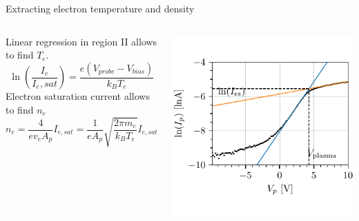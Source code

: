 \documentclass[10pt]{beamer}
\begin{document}
\begin{frame}{Extracting electron temperature and density}
    \begin{columns}
        Linear regression in region II allows to find $T_e$.
        \begin{equation*}
            \ln\left(\frac{I_e}{I_e,sat} \right) = \frac{e(V_{probe} - V_{bias})}{k_B T_e}
        \end{equation*} 
        Electron saturation current allows to find $n_e$
        \begin{equation*}
            n_e = \frac{4}{e v_e A_p} I_{e,sat} = \frac{1}{e A_p} \sqrt{\frac{2 \pi m_e}{k_B T_e}} I_{e,sat}
        \end{equation*}

        \includegraphics[scale=1]{../figures/IV_fit.pdf}
    \end{columns}
\end{frame}
\end{document}
